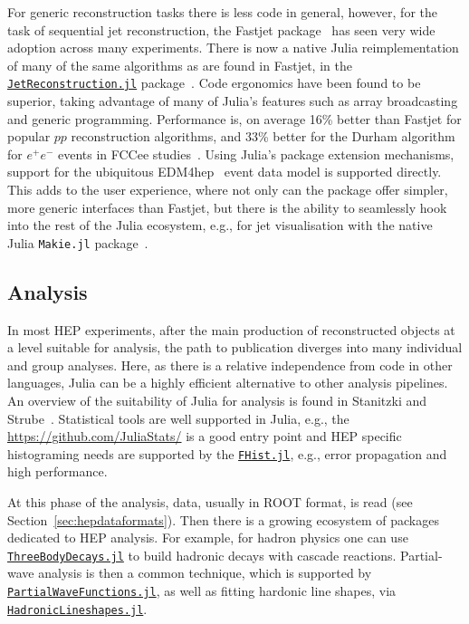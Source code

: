 \documentclass{webofc}
\begin{document}
For generic reconstruction tasks there is less code in general, however, for the
task of sequential jet reconstruction, the Fastjet
package~\cite{Cacciari:2011ma} has seen very wide adoption across many
experiments. There is now a native Julia reimplementation of many of the same
algorithms as are found in Fastjet, in the
\href{https://doi.org/10.5281/zenodo.12671414}{\texttt{JetReconstruction.jl}}
package~\cite{polyglot-jets-chep23}. Code ergonomics have been found to be
superior, taking advantage of many of Julia's features such as array
broadcasting and generic programming. Performance is, on average 16\% better
than Fastjet for popular $pp$ reconstruction algorithms, and 33\% better for the
Durham algorithm for $e^+e^-$ events in FCCee
studies~\cite{fast-jet-reco-julia}. Using Julia's package extension mechanisms,
support for the ubiquitous EDM4hep~\cite{Gaede:2022leb} event data model is
supported directly. This adds to the user experience, where not only can the
package offer simpler, more generic interfaces than Fastjet, but there is the
ability to seamlessly hook into the rest of the Julia ecosystem, e.g., for jet
visualisation with the native Julia \texttt{Makie.jl}
package~\cite{Danisch2021}.

\subsection{Analysis}

In most HEP experiments, after the main production of reconstructed objects at a
level suitable for analysis, the path to publication diverges into many
individual and group analyses. Here, as there is a relative independence from
code in other languages, Julia can be a highly efficient alternative to other
analysis pipelines. An overview of the suitability of Julia for analysis is
found in Stanitzki and Strube~\cite{Stanitzki:2020bnx}. Statistical tools are
well supported in Julia, e.g., the \href{Julia Statistics
community}{https://github.com/JuliaStats/} is a good entry point and HEP
specific histograming needs are supported by the
\href{https://github.com/Moelf/FHist.jl/}{\texttt{FHist.jl}}, e.g., error
propagation and high performance.

At this phase of the analysis, data, usually in ROOT format, is read (see
Section~\ref{sec:hepdataformats}). Then there is a growing ecosystem of packages
dedicated to HEP analysis. For example, for hadron physics one can use
\href{https://github.com/mmikhasenko/ThreeBodyDecays.jl}{\texttt{ThreeBodyDecays.jl}}
to build hadronic decays with cascade reactions. Partial-wave analysis is then a
common technique, which is supported by
\href{https://github.com/mmikhasenko/PartialWaveFunctions.jl}{\texttt{PartialWaveFunctions.jl}},
as well as fitting hardonic line shapes, via
\href{https://github.com/mmikhasenko/HadronicLineshapes.jl}{\texttt{HadronicLineshapes.jl}}.
\end{document}
